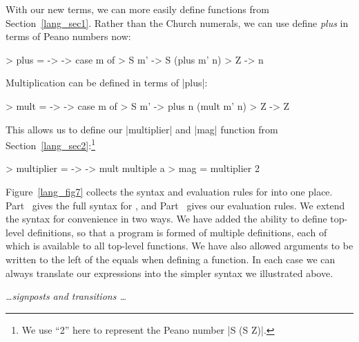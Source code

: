 \documentclass[12pt]{report}
\begin{document}
With our new terms, we can more easily define functions from
Section~\ref{lang_sec1}. Rather than the Church numerals,
we can use define \emph{plus} in terms of Peano numbers now:

> plus = \m -> \n -> case m of
>   S m' -> S (plus m' n)
>   Z -> n

Multiplication can be defined in terms of |plus|:

> mult = \m -> \n -> case m of
>   S m' -> plus n (mult m' n)
>   Z -> Z

This allows us to define our |multiplier| and |mag| function from
Section~\ref{lang_sec2}:\footnote{We use ``2'' here to represent the
  Peano number |S (S Z)|.}

> multiplier = \multiple -> \a -> mult multiple a
> mag = multiplier 2

Figure~\ref{lang_fig7} collects the syntax and evaluation rules for
\lamC into one place. Part~ gives the full
syntax for \lamC, and Part~ gives our
evaluation rules. We extend the syntax for convenience in two ways. We
have added the ability to define top-level definitions, so that a
program is formed of multiple definitions, each of which is available
to all top-level functions. We have also allowed arguments to be
written to the left of the equals when defining a function.  In each
case we can always translate our expressions into the simpler syntax
we illustrated above.

\emph{\ldots signposts and transitions \ldots}

\afterpage{\clearpage\clearpage}



\end{document}
